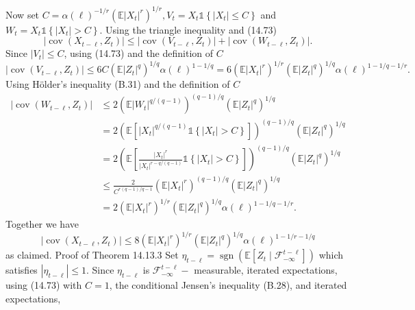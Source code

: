 \documentclass[10pt]{article}
\begin{document}
Now set $C=\alpha(\ell)^{-1 / r}\left(\mathbb{E}\left|X_{t}\right|^{r}\right)^{1 / r}, V_{t}=X_{t} \mathbb{1}\left\{\left|X_{t}\right| \leq C\right\}$ and $W_{t}=X_{t} \mathbb{1}\left\{\left|X_{t}\right|>C\right\}$. Using the triangle inequality and (14.73)
$$
\left|\operatorname{cov}\left(X_{t-\ell}, Z_{t}\right)\right| \leq\left|\operatorname{cov}\left(V_{t-\ell}, Z_{t}\right)\right|+\left|\operatorname{cov}\left(W_{t-\ell}, Z_{t}\right)\right| .
$$
Since $\left|V_{t}\right| \leq C$, using (14.73) and the definition of $C$
$$
\left|\operatorname{cov}\left(V_{t-\ell}, Z_{t}\right)\right| \leq 6 C\left(\mathbb{E}\left|Z_{t}\right|^{q}\right)^{1 / q} \alpha(\ell)^{1-1 / q}=6\left(\mathbb{E}\left|X_{t}\right|^{r}\right)^{1 / r}\left(\mathbb{E}\left|Z_{t}\right|^{q}\right)^{1 / q} \alpha(\ell)^{1-1 / q-1 / r} .
$$
Using Hölder's inequality (B.31) and the definition of $C$
$$
\begin{aligned}
\left|\operatorname{cov}\left(W_{t-\ell}, Z_{t}\right)\right| & \leq 2\left(\mathbb{E}\left|W_{t}\right|^{q /(q-1)}\right)^{(q-1) / q}\left(\mathbb{E}\left|Z_{t}\right|^{q}\right)^{1 / q} \\
&=2\left(\mathbb{E}\left[\left|X_{t}\right|^{q /(q-1)} \mathbb{1}\left\{\left|X_{t}\right|>C\right\}\right]\right)^{(q-1) / q}\left(\mathbb{E}\left|Z_{t}\right|^{q}\right)^{1 / q} \\
&=2\left(\mathbb{E}\left[\frac{\left|X_{t}\right|^{r}}{\left|X_{t}\right|^{r-q /(q-1)}} \mathbb{1}\left\{\left|X_{t}\right|>C\right\}\right]\right)^{(q-1) / q}\left(\mathbb{E}\left|Z_{t}\right|^{q}\right)^{1 / q} \\
& \leq \frac{2}{C^{r(q-1) / q-1}}\left(\mathbb{E}\left|X_{t}\right|^{r}\right)^{(q-1) / q}\left(\mathbb{E}\left|Z_{t}\right|^{q}\right)^{1 / q} \\
&=2\left(\mathbb{E}\left|X_{t}\right|^{r}\right)^{1 / r}\left(\mathbb{E}\left|Z_{t}\right|^{q}\right)^{1 / q} \alpha(\ell)^{1-1 / q-1 / r} .
\end{aligned}
$$
Together we have
$$
\left|\operatorname{cov}\left(X_{t-\ell}, Z_{t}\right)\right| \leq 8\left(\mathbb{E}\left|X_{t}\right|^{r}\right)^{1 / r}\left(\mathbb{E}\left|Z_{t}\right|^{q}\right)^{1 / q} \alpha(\ell)^{1-1 / r-1 / q}
$$
as claimed. Proof of Theorem 14.13.3 Set $\eta_{t-\ell}=\operatorname{sgn}\left(\mathbb{E}\left[Z_{t} \mid \mathscr{F}_{-\infty}^{t-\ell}\right]\right)$ which satisfies $\left|\eta_{t-\ell}\right| \leq 1$. Since $\eta_{t-\ell}$ is $\mathscr{F}_{-\infty}^{t-\ell}-$ measurable, iterated expectations, using (14.73) with $C=1$, the conditional Jensen's inequality (B.28), and iterated expectations,
\end{document}
